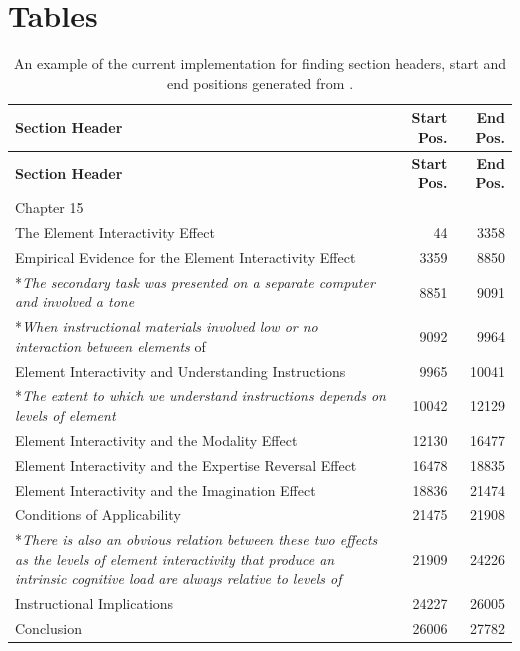 \documentclass[12pt]{article}
\theoremstyle{grammarstyle}
\begin{document}
\section{Tables}
\begin{longtable}{|p{8cm}|r|r|}
    \caption{An example of the current implementation for finding section headers, start and end positions generated from  \citep{sweller2011element}.}
    \label{tab:section_finding_example} \\
    \hline
    \textbf{Section Header} & \textbf{Start Pos.} & \textbf{End Pos.} \\
    \hline
    \endfirsthead
    
    \hline
    \textbf{Section Header} & \textbf{Start Pos.} & \textbf{End Pos.} \\
    \hline
    \endhead
    
    Chapter 15 & & \\
    The Element Interactivity Effect &  44 & 3358 \\ 
    \hline
    Empirical Evidence for the Element Interactivity Effect &  3359 & 8850 \\ \hline
    *\textit{The secondary task was presented on a separate computer and involved a tone} &  8851 & 9091 \\ 
    \hline
    *\textit{When instructional materials involved low or no interaction between elements} of &  9092 & 9964 \\ 
    \hline
    Element Interactivity and Understanding Instructions &  9965 & 10041 \\ 
    \hline
    *\textit{The extent to which we understand instructions depends on levels of element} &  10042 & 12129 \\ 
    \hline
    Element Interactivity and the Modality Effect &  12130 & 16477 \\ 
    \hline
    Element Interactivity and the Expertise Reversal Effect &  16478 & 18835 \\ \hline
    Element Interactivity and the Imagination Effect &  18836 & 21474 \\ 
    \hline
    Conditions of Applicability &  21475 & 21908 \\ 
    \hline
    *\textit{There is also an obvious relation between these two effects as the levels of element
    interactivity that produce an intrinsic cognitive load are always relative to levels of} &  21909 & 24226 \\ 
    \hline
    Instructional Implications &  24227 & 26005 \\ 
    \hline
    Conclusion &  26006 & 27782 \\ 
    \hline
\end{longtable}
\end{document}
